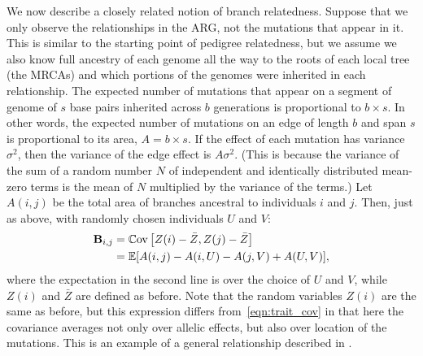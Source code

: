 We now describe a closely related notion of branch relatedness.
%
Suppose that we only observe the relationships in the ARG,
not the mutations that appear in it.
%
This is similar to the starting point of pedigree relatedness,
but we assume we also know full ancestry of each genome all the way to the roots
of each local tree (the MRCAs) and
which portions of the genomes were inherited in each relationship.
%
The expected number of mutations that appear on a segment of genome of $s$ base pairs
inherited across $b$ generations is proportional to $b \times s$.
%
In other words, the expected number of mutations on an edge of length $b$ and span $s$
is proportional to its area, $A = b \times s$.
%
If the effect of each mutation has variance $\sigma^2$,
then the variance of the edge effect is $A \sigma^2$.
%
(This is because the variance of the sum of a random number $N$ of
independent and identically distributed mean-zero terms is
the mean of $N$ multiplied by the variance of the terms.)
%
Let $A(i,j)$ be the total area of branches ancestral to individuals $i$ and $j$.
%
Then, just as above, with randomly chosen individuals $U$ and $V$:
%
\begin{align} \label{eqn:branch_cov}
    \mathbf{B}_{i,j}
         &=\mathbb{C}\text{ov}\left[Z(i) - \bar{Z}, Z(j) - \bar{Z}\right] \notag \\
         &= \mathbb{E}[A(i,j) - A(i,U) - A(j,V) + A(U,V)] , 
\end{align}
%
where the expectation in the second line is over the choice of $U$ and $V$,
while $Z(i)$ and $\bar{Z}$ are defined as before.
%
Note that the random variables $Z(i)$ are the same as before,
but this expression differs from~\eqref{eqn:trait_cov} in that
here the covariance averages not only over allelic effects,
but also over location of the mutations.
%
This is an example of a general relationship described in \citet{ralph2020efficiently}.

